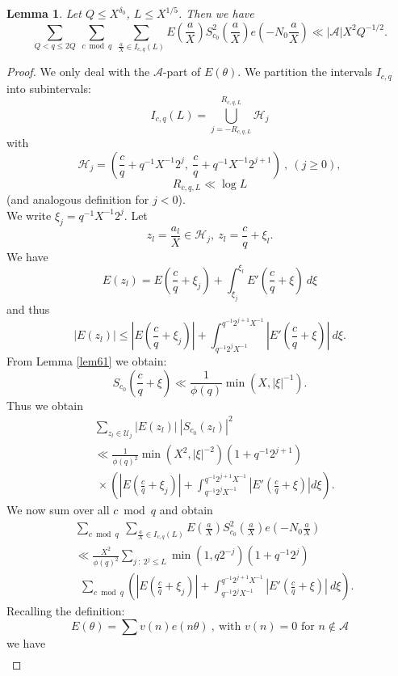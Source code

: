 \documentclass{amsart}
\newtheorem{lemma}[theorem]{Lemma}
\numberwithin{equation}{subsection}
\begin{document}
\begin{lemma}\label{lem621}
Let $Q\leq X^{\delta_0}$, $L\leq X^{1/5}$. Then we have
$$\sum_{Q< q\leq 2Q}\  \sum_{c \bmod q}\  \sum_{\frac{a}{X}\in I_{c,q}(L)} E \left(\frac{a}{X}\right) S_{c_0}^2  \left(\frac{a}{X}\right) e(-N_0\frac{a}{X}) \ll |\mathcal{A}| X^2 Q^{-1/2}.$$
\end{lemma}
\begin{proof}
We only deal with the $\mathcal{A}$-part of $E(\theta)$. We partition the intervals $I_{c,q}$ into subintervals:
$$I_{c,q}(L)=\bigcup_{j=-R_{c,q,L}}^{R_{c,q,L}}\mathcal{H}_j  $$
with 
$$\mathcal{H}_j=\left(\frac{c}{q}+q^{-1} X^{-1} 2^j,\ \frac{c}{q}+q^{-1} X^{-1} 2^{j+1}\right)\:,\ (j\geq 0),$$
$$R_{c, q, L}\ll \log L$$
(and analogous definition for $j<0$).\\
We write $\xi_j=q^{-1} X^{-1} 2^j$. Let 
$$z_l=\frac{a_l}{X}\in \mathcal{H}_j,\ z_l=\frac{c}{q}+\xi_l.$$
We have 
$$E(z_l)=E\left(\frac{c}{q}+\xi_j\right)+\int_{\xi_j}^{\xi_l} E'\left(\frac{c}{q}+\xi\right)\: d\xi$$
and thus
$$|E(z_l)|\leq \left| E\left(\frac{c}{q}+\xi_j\right)\right|+\int_{q^{-1}2^j X^{-1}}^{q^{-1}2^{j+1}X^{-1}} \left|E'\left(\frac{c}{q}+\xi\right)\right|\: d\xi.$$
From Lemma \ref{lem61} we obtain:
$$S_{c_0}\left(\frac{c}{q}+\xi\right)\ll \frac{1}{\phi(q)} \min(X, |\xi|^{-1}).$$
Thus we obtain
\begin{align*}
&\sum_{z_l\in \mathcal{U}_j} |E(z_l)|\: |S_{c_0}(z_l)|^2\\
&\ll \frac{1}{\phi(q)^2} \min (X^2, |\xi|^{-2})(1+q^{-1}2^{j+1})\\
&\ \times \left( \left|E\left(\frac{c}{q}+\xi_j\right)\right|+\int_{q^{-1}2^jX^{-1}}^{q^{-1}2^{j+1}X^{-1}}\left|E'\left(\frac{c}{q}+\xi\right)  \right| d\xi  \right).
\end{align*}
We now sum over all $c\bmod q$ and obtain
\begin{align*}
&\sum_{c\bmod q}\ \sum_{\frac{a}{X}\in I_{c,q}(L)} E\left(\frac{a}{X}\right) S_{c_0}^2\left(\frac{a}{X}\right) e\left(-N_0\frac{a}{X}\right)  \tag{6.20}\\
&\ll \frac{X^2}{\phi(q)^2} \sum_{j\::\: 2^j\leq L} \min(1, q2^{-j})(1+q^{-1}2^j)\\
&\ \ \sum_{c\bmod q}\left(\left| E\left(\frac{c}{q}+\xi_j\right)\right|+\int_{q^{-1}2^jX^{-1}}^{q^{-1}2^{j+1}X^{-1}}\left| E'\left(\frac{c}{q}+\xi\right)\right|\: d\xi \right).
\end{align*}
Recalling the definition:
\[
E(\theta)=\sum v(n) e(n\theta)\:,\ \text{with $v(n)=0$ for $n\not\in \mathcal{A}$} \tag{2.7}
\]
we have
\begin{align*}

\end{align*}
\end{proof}
\end{document}
